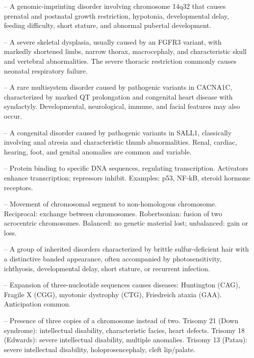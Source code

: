 -- A genomic-imprinting disorder involving chromosome 14q32 that causes prenatal and postnatal growth restriction, hypotonia, developmental delay, feeding difficulty, short stature, and abnormal pubertal development.

-- A severe skeletal dysplasia, usually caused by an FGFR3 variant, with markedly shortened limbs, narrow thorax, macrocephaly, and characteristic skull and vertebral abnormalities. The severe thoracic restriction commonly causes neonatal respiratory failure.

-- A rare multisystem disorder caused by pathogenic variants in CACNA1C, characterized by marked QT prolongation and congenital heart disease with syndactyly. Developmental, neurological, immune, and facial features may also occur.

-- A congenital disorder caused by pathogenic variants in SALL1, classically involving anal atresia and characteristic thumb abnormalities. Renal, cardiac, hearing, foot, and genital anomalies are common and variable.

-- Protein binding to specific DNA sequences, regulating transcription. Activators enhance transcription; repressors inhibit. Examples: p53, NF-kB, steroid hormone receptors.

-- Movement of chromosomal segment to non-homologous chromosome. Reciprocal: exchange between chromosomes. Robertsonian: fusion of two acrocentric chromosomes. Balanced: no genetic material lost; unbalanced: gain or loss.

-- A group of inherited disorders characterized by brittle sulfur-deficient hair with a distinctive banded appearance, often accompanied by photosensitivity, ichthyosis, developmental delay, short stature, or recurrent infection.

-- Expansion of three-nucleotide sequences causes diseases: Huntington (CAG), Fragile X (CGG), myotonic dystrophy (CTG), Friedreich ataxia (GAA). Anticipation common.

-- Presence of three copies of a chromosome instead of two. Trisomy 21 (Down syndrome): intellectual disability, characteristic facies, heart defects. Trisomy 18 (Edwards): severe intellectual disability, multiple anomalies. Trisomy 13 (Patau): severe intellectual disability, holoprosencephaly, cleft lip/palate.

